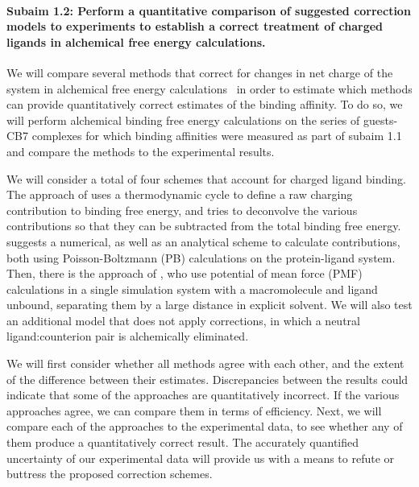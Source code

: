\documentclass[10pt,final]{article}
\newcommand{\subsubsubsection}[1]{\paragraph*{#1}}
\begin{document}
\subsubsubsection{Subaim 1.2: Perform a quantitative comparison of suggested correction models to experiments to establish a correct treatment of charged ligands in alchemical free energy calculations.}
We will compare several methods that correct for changes in net charge of the system in alchemical free energy calculations~\autocite{Reif2013a,Rocklin2013a, Lin2014a} in order to estimate which methods can provide quantitatively correct estimates of the binding affinity.
%
To do so, we will perform alchemical binding free energy calculations on the series of guests-CB7 complexes for which binding affinities were measured as part of subaim 1.1 and compare the methods to the experimental results.

We will consider a total of four schemes that account for charged ligand binding.
%
The approach of \textcite{Reif2013a} uses a thermodynamic cycle to define a raw charging contribution to binding free energy, and tries to deconvolve the various contributions so that they can be subtracted from the total binding free energy.
%
\textcite{Rocklin2013a} suggests a numerical, as well as an analytical scheme to calculate contributions, both using Poisson-Boltzmann (PB) calculations on the protein-ligand system.
%
Then, there is the approach of \textcite{Lin2014a}, who use potential of mean force (PMF) calculations in a single simulation system with a macromolecule and ligand unbound, separating them by a large distance in explicit solvent.
%
We will also test an additional model that does not apply corrections, in which a neutral ligand:counterion pair is alchemically eliminated. 


%
We will first consider whether all methods agree with each other, and the extent of the difference between their estimates.
%
Discrepancies between the results could indicate that some of the approaches are quantitatively incorrect.
%
If the various approaches agree, we can compare them in terms of efficiency.
%
Next, we will compare each of the approaches to the experimental data, to see whether any of them produce a quantitatively correct result.
%
The accurately quantified uncertainty of our experimental data will provide us with a means to refute or buttress the proposed correction schemes.
\end{document}

